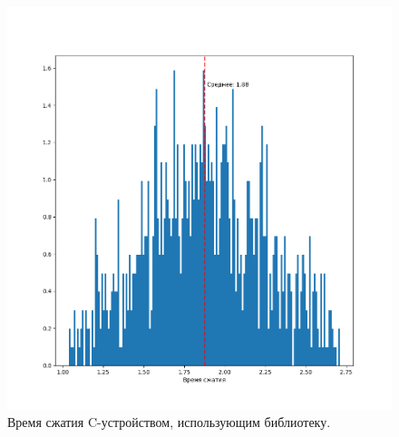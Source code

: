 \begin{figure}[!htbp]
    \centering
    \begin{adjustbox}{max totalsize={\textwidth}{\textheight}}
        \includegraphics{images/hist-lib-c-dev.png}
    \end{adjustbox}
    \caption{Время сжатия C-устройством, использующим библиотеку.}\label{fig:hist-lib-c-dev}
\end{figure}


